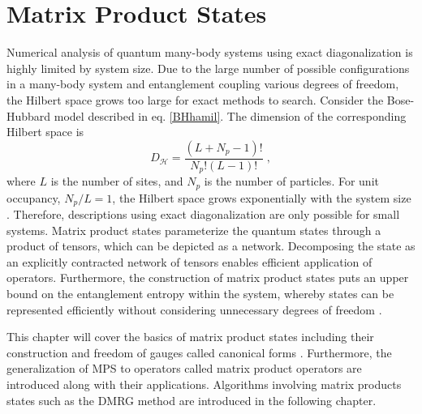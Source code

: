 \chapter{Matrix Product States} \label{chap:MPS}
Numerical analysis of quantum many-body systems using exact diagonalization is highly limited by system size. Due to the large number of possible configurations in a many-body system and entanglement coupling various degrees of freedom, the Hilbert space grows too large for exact methods to search.
Consider the Bose-Hubbard model described in eq. \eqref{BHhamil}. The dimension of the corresponding Hilbert space is
\begin{equation}
	D_{\mathcal{H}} = \frac{(L+N_p -1)!}{N_p ! (L-1)!} \; ,
\end{equation}
where $L$ is the number of sites, and $N_p$ is the number of particles. For unit occupancy, $N_p / L = 1$, the Hilbert space grows exponentially with the system size \cite{Dong}. Therefore, descriptions using exact diagonalization are only possible for small systems.
Matrix product states parameterize the quantum states through a product of tensors, which can be depicted as a network. Decomposing the state as an explicitly contracted network of tensors enables efficient application of operators. Furthermore, the construction of matrix product states puts an upper bound on the entanglement entropy within the system, whereby states can be represented efficiently without considering unnecessary degrees of freedom \cite{Cramer}.

This chapter will cover the basics of matrix product states including their construction and freedom of gauges called canonical forms \cite{schollwock}. Furthermore, the generalization of MPS to operators called matrix product operators are introduced along with their applications. Algorithms involving matrix products states such as the DMRG method \cite{White1992,White1993} are introduced in the following chapter.


